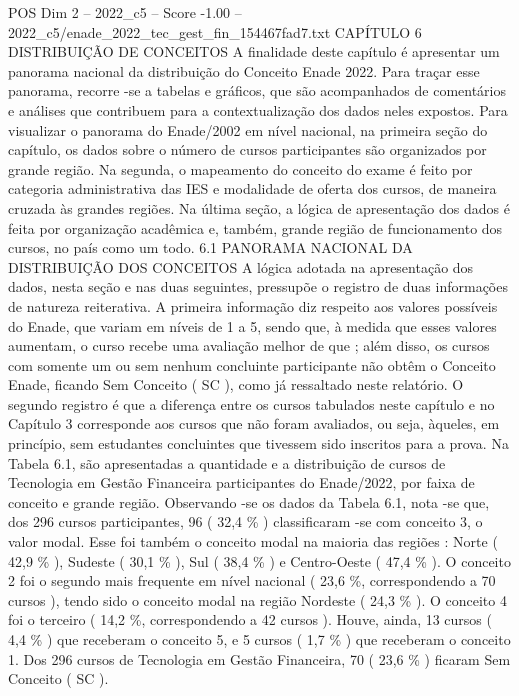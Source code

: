 \begin{textsample}{POS Dim 2 – 2022\_c5 – Score -1.00 – 2022\_c5/enade\_2022\_tec\_gest\_fin\_154467fad7.txt}  \label{ex:f2_pos_224}
CAPÍTULO 6 DISTRIBUIÇÃO DE CONCEITOS A finalidade deste capítulo é apresentar um panorama nacional da distribuição do Conceito Enade 2022.
Para traçar esse panorama, recorre -se a tabelas e gráficos, que são acompanhados de comentários e análises que contribuem para a contextualização dos dados neles expostos.
Para visualizar o panorama do Enade/2002 em nível nacional, na primeira seção do capítulo, os dados sobre o número de cursos participantes são organizados por grande região.
Na segunda, o mapeamento do conceito do exame é feito por categoria administrativa das IES e modalidade de oferta dos cursos, de maneira cruzada às grandes regiões.
Na última seção, a lógica de apresentação dos dados é feita por organização acadêmica e, também, grande região de funcionamento dos cursos, no país como um todo. 6.1 PANORAMA NACIONAL DA DISTRIBUIÇÃO DOS CONCEITOS A lógica adotada na apresentação dos dados, nesta seção e nas duas seguintes, pressupõe o registro de duas informações de natureza reiterativa.
A primeira informação diz respeito aos valores possíveis do Enade, que variam em níveis de 1 a 5, sendo que, à medida que esses valores aumentam, o curso recebe uma avaliação melhor de que ; além disso, os cursos com somente um ou sem nenhum concluinte participante não obtêm o Conceito Enade, ficando Sem Conceito ( SC ), como já ressaltado neste relatório.
O segundo registro é que a diferença entre os cursos tabulados neste capítulo e no Capítulo 3 corresponde aos cursos que não foram avaliados, ou seja, àqueles, em princípio, sem estudantes concluintes que tivessem sido inscritos para a prova.
Na Tabela 6.1, são apresentadas a quantidade e a distribuição de cursos de Tecnologia em Gestão Financeira participantes do Enade/2022, por faixa de conceito e grande região.
Observando -se os dados da Tabela 6.1, nota -se que, dos 296 cursos participantes, 96 ( 32,4 \% ) classificaram -se com conceito 3, o valor modal.
Esse foi também o conceito modal na maioria das regiões : Norte ( 42,9 \% ), Sudeste ( 30,1 \% ), Sul ( 38,4 \% ) e Centro-Oeste ( 47,4 \% ).
O conceito 2 foi o segundo mais frequente em nível nacional ( 23,6 \%, correspondendo a 70 cursos ), tendo sido o conceito modal na região Nordeste ( 24,3 \% ).
O conceito 4 foi o terceiro ( 14,2 \%, correspondendo a 42 cursos ).
Houve, ainda, 13 cursos ( 4,4 \% ) que receberam o conceito 5, e 5 cursos ( 1,7 \% ) que receberam o conceito 1.
Dos 296 cursos de Tecnologia em Gestão Financeira, 70 ( 23,6 \% ) ficaram Sem Conceito ( SC ).

\end{textsample}
